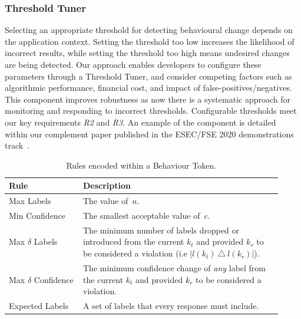 \subsubsection{Threshold Tuner} Selecting an appropriate threshold for detecting behavioural change depends on the application context. Setting the threshold too low increases the likelihood of incorrect results, while setting the threshold too high means undesired changes are being detected. Our approach enables developers to configure these parameters through a Threshold Tuner, and consider competing factors such as algorithmic performance, financial cost, and impact of false-positives/negatives. This component improves robustness as now there is a systematic approach for monitoring and responding to incorrect thresholds. Configurable thresholds meet our key requirements \textit{R2} and \textit{R3}.
An example of the component is detailed within our complement paper published in the ESEC/FSE 2020 demonstrations track~\citep{Cummaudo:2020fse-demo}.
 
\begin{table}[t]
    \centering
    \caption[Rules encoded within behaviour tokens]{Rules encoded within a Behaviour Token.}
    \label{tab:behaviour-token-rules}
    \small
    \begin{tabular}{p{0.25\linewidth}|p{0.675\linewidth}}
    \toprule
    \textbf{Rule} &
    \textbf{Description}\\
    \midrule
    Max Labels & The value of~$n$.\\
    Min Confidence & The smallest acceptable value of~$c$.\\
    Max $\delta$ Labels & The minimum number of labels dropped or introduced from the current $k_{t}$ and provided $k_{r}$ to be considered a violation (i.e $|l(k_{t})~\triangle~l(k_{r})|$).\\
    Max $\delta$ Confidence & The minimum confidence change of \textit{any} label from the current $k_{t}$ and provided $k_{r}$ to be considered a violation.\\
    Expected Labels & A set of labels that every response must include.\\
    \bottomrule
    \end{tabular}
\end{table}

